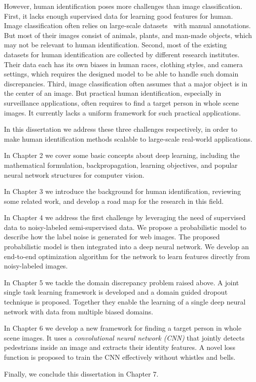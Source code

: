 However, human identification poses more challenges than image classification. First, it lacks enough supervised data for learning good features for human. Image classification often relies on large-scale datasets~\cite{deng2009imagenet
} with manual annotations. But most of their images consist of animals, plants, and man-made objects, which may not be relevant to human identification. Second, most of the existing datasets for human identification are collected by different research institutes. Their data each has its own biases in human races, clothing styles, and camera settings, which requires the designed model to be able to handle such domain discrepancies. Third, image classification often assumes that a major object is in the center of an image. But practical human identification, especially in surveillance applications, often requires to find a target person in whole scene images. It currently lacks a uniform framework for such practical applications.

In this dissertation we address these three challenges respectively, in order to make human identification methods scalable to large-scale real-world applications.

In Chapter 2 we cover some basic concepts about deep learning, including the mathematical formulation, backpropagation, learning objectives, and popular neural network structures for computer vision.

In Chapter 3 we introduce the background for human identification, reviewing some related work, and develop a road map for the research in this field.

In Chapter 4 we address the first challenge by leveraging the need of supervised data to noisy-labeled semi-supervised data. We propose a probabilistic model to describe how the label noise is generated for web images. The proposed probabilistic model is then integrated into a deep neural network. We develop an end-to-end optimization algorithm for the network to learn features directly from noisy-labeled images.

In Chapter 5 we tackle the domain discrepancy problem raised above. A joint single task learning framework is developed and a domain guided dropout technique is proposed. Together they enable the learning of a single deep neural network with data from multiple biased domains.

In Chapter 6 we develop a new framework for finding a target person in whole scene images. It uses a \emph{convolutional neural network (CNN)} that jointly detects pedestrians inside an image and extracts their identity features. A novel loss function is proposed to train the CNN effectively without whistles and bells.

Finally, we conclude this dissertation in Chapter 7.